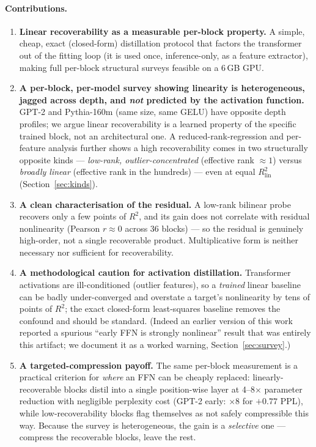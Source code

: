 \documentclass{article}
\newcommand{\Rlin}{R^2_{\mathrm{lin}}}
\begin{document}
\paragraph{Contributions.}
\begin{enumerate}
\item \textbf{Linear recoverability as a measurable per-block property.} A simple, cheap,
  exact (closed-form) distillation protocol that factors the transformer out of the fitting
  loop (it is used once, inference-only, as a feature extractor), making full per-block
  structural surveys feasible on a 6\,GB GPU.
\item \textbf{A per-block, per-model survey showing linearity is heterogeneous, jagged
  across depth, and \emph{not} predicted by the activation function.} GPT-2 and Pythia-160m
  (same size, same GELU) have opposite depth profiles; we argue linear recoverability is a
  learned property of the specific trained block, not an architectural one. A
  reduced-rank-regression and per-feature analysis further shows a high recoverability comes
  in two structurally opposite kinds --- \emph{low-rank, outlier-concentrated} (effective
  rank $\approx 1$) versus \emph{broadly linear} (effective rank in the hundreds) --- even at
  equal $\Rlin$ (Section~\ref{sec:kinds}).
\item \textbf{A clean characterisation of the residual.} A low-rank bilinear probe recovers
  only a few points of $R^2$, and its gain does not correlate with residual nonlinearity
  (Pearson $r\approx 0$ across 36 blocks) --- so the residual is genuinely high-order, not a
  single recoverable product. Multiplicative form is neither necessary nor sufficient for
  recoverability.
\item \textbf{A methodological caution for activation distillation.} Transformer activations
  are ill-conditioned (outlier features), so a \emph{trained} linear baseline can be badly
  under-converged and overstate a target's nonlinearity by tens of points of $R^2$; the
  exact closed-form least-squares baseline removes the confound and should be standard.
  (Indeed an earlier version of this work reported a spurious ``early FFN is strongly
  nonlinear'' result that was entirely this artifact; we document it as a worked warning,
  Section~\ref{sec:survey}.)
\item \textbf{A targeted-compression payoff.} The same per-block measurement is a practical
  criterion for \emph{where} an FFN can be cheaply replaced: linearly-recoverable blocks
  distil into a single position-wise layer at 4--8$\times$ parameter reduction with
  negligible perplexity cost (GPT-2 early: $\times 8$ for $+0.77$ PPL), while
  low-recoverability blocks flag themselves as not safely compressible this way. Because the
  survey is heterogeneous, the gain is a \emph{selective} one --- compress the recoverable
  blocks, leave the rest.
\end{enumerate}
\end{document}
